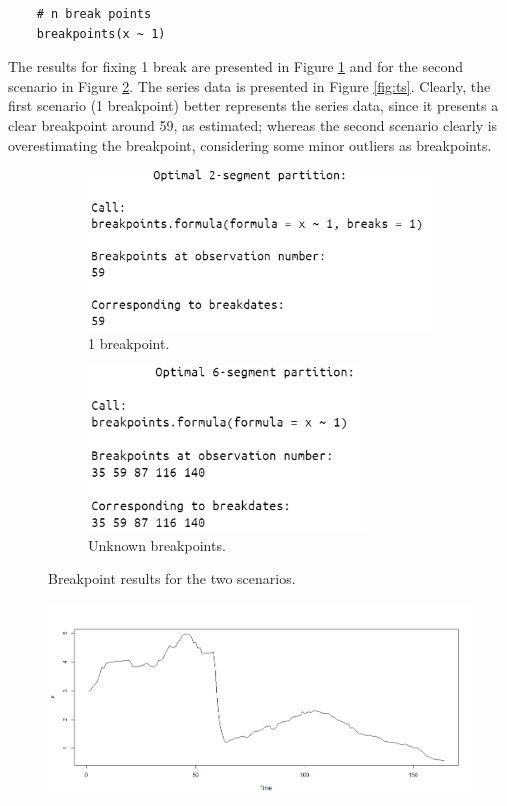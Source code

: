 \documentclass[fleqn]{article}
\begin{document}
\begin{enumerate}
\begin{verbatim}
    # n break points
    breakpoints(x ~ 1)
    \end{verbatim}
    The results for fixing 1 break are presented in Figure \ref{fig:1} and for the second scenario in Figure \ref{fig:n}. The series data is presented in Figure \ref{fig:ts}. Clearly, the first scenario (1 breakpoint) better represents the series data, since it presents a clear breakpoint around 59, as estimated; whereas the second scenario clearly is overestimating the breakpoint, considering some minor outliers as breakpoints.
    \begin{figure}[H]
    \centering
    \begin{subfigure}[b]{0.45\textwidth}
        \centering
        \includegraphics[width=\textwidth]{figs/1.png}
        \caption{1 breakpoint.}
        \label{fig:1}
    \end{subfigure}
    \begin{subfigure}[b]{0.45\textwidth}  
        \centering 
        \includegraphics[width=0.8\textwidth]{figs/n.png}
        \caption{Unknown breakpoints.}
        \label{fig:n}
    \end{subfigure}
    \caption{Breakpoint results for the two scenarios.}
    \label{fig:breaks}
\end{figure}
\begin{figure}[H]
        \centering
        \includegraphics[width=\textwidth]{figs/ts.png}

\end{figure}
\end{enumerate}
\end{document}
